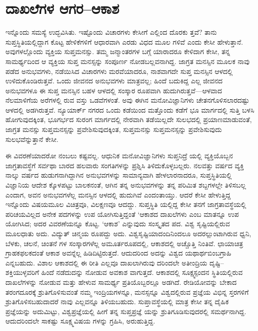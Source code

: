 \section{ದಾಖಲೆಗಳ ಆಗರ–ಆಕಾಶ}

ಇನ್ನೊಂದು ಸಮಸ್ಯೆ ಉದ್ಭವಿಸಿತು. ಇಷ್ಟೊಂದು ವಿಚಾರಗಳು ಕೇಸೀಗೆ ಎಲ್ಲಿಂದ ದೊರಕು ತ್ತವೆ? ತಾನು ಸುಪ್ತಸ್ಥಿತಿಯಲ್ಲಿದ್ದಾಗ ಕೊಟ್ಟ ಹೇಳಿಕೆಗಳಿಗೆ ಆಧಾರವಾಗಿ ಎರಡು ವಿಧದ ಮೂಲ ಗಳಿವೆ ಎಂದು ಕೇಸೀ ಹೇಳುತ್ತಾನೆ. ಅವುಗಳಲ್ಲೊಂದು ವ್ಯಕ್ತಿಯ ಸುಪ್ತಮನಸ್ಸು. ತಮ್ಮ ಜನ್ಮಾಂತರಗಳ ಬಗ್ಗೆ ಯಾರಾದರೂ ಕೇಳಿದಾಗ ಕೇಸೀ, ತನ್ನ ಸಾಮರ್ಥ್ಯದಿಂದ ಆ ವ್ಯಕ್ತಿಯ ಸುಪ್ತ ಮನಸ್ಸನ್ನು ಸಂಪೂರ್ಣ ನೋಡಬಲ್ಲವನಾಗಿದ್ದ. ಜಾಗ್ರತ ಮನಸ್ಸಿನ ಮೂಲಕ ನಾವು ಪಡೆದ ಅನುಭವಗಳು, ನಡೆಯಿಸಿದ ವಿಚಾರಗಳು ಮರವೆಯಾದರೂ, ನಾಶವಾಗದೇ ಸುಪ್ತ ಮನಸ್ಸಿನ ಆಳದಲ್ಲಿ ಉಳಿದುಕೊಂಡಿರುತ್ತವೆ. ಒಂದು ಜೀವನದ ಅನುಭವಗಳು ಮಾತ್ರವಲ್ಲ; ಹಿಂದೆ ಬದುಕಿದ್ದ ಎಲ್ಲ ಜೀವನದ ಅನುಭವಗಳೂ ಈ ಸುಪ್ತ ಮನಸ್ಸಿನ  ಬಹಳ ಆಳದಲ್ಲಿ ಸಂಸ್ಕಾರ ರೂಪವಾಗಿ ಹುದುಗಿರುತ್ತವೆ—ಆಳವಾದ ನೆಲಮಾಳಿಗೆಯ ಅರೆಗಳಲ್ಲಿ ರುವ ವಸ್ತು ಒಡವೆಗಳಂತೆ. ಅವು ಈಗಿನ ಮನೋವಿಜ್ಞಾನಿಗಳು ಚೇತನಗೊಳಿಸಲಾರದಷ್ಟು ಆಳದಲ್ಲಿ ಅಡಗಿರುತ್ತವೆ. ನ್ಯೂಯಾರ್ಕ್ ನಗರದ ಒಂದು ಕಡೆಯಿಂದ ಮತ್ತೊಂದು ಕಡೆಗೆ ಭೂ ಮಾರ್ಗದಲ್ಲಿ ಸುತ್ತಿ ಬಳಸಿ ಹೋಗುವುದಕ್ಕಿಂತ, ಭೂಗರ್ಭದ ಸುರಂಗ ಮಾರ್ಗದಲ್ಲಿ ನೇರವಾಗಿ ತಡೆಯಿಲ್ಲದೇ ಸುಲಭದಲ್ಲಿ ಪ್ರಯಾಣಮಾಡುವಂತೆ, ಜಾಗ್ರತ ಮನಸ್ಸು ಸುಪ್ತಮನಸ್ಸನ್ನು ಪ್ರವೇಶಿಸುವುದಕ್ಕಿಂತ, ಸುಪ್ತಮನಸ್ಸು ಸುಪ್ತಮನಸ್ಸನ್ನು ಪ್ರವೇಶಿಸುವುದು ಸುಲಭವೆನ್ನುತ್ತಾನೆ ಕೇಸೀ.

ಈ ವಿವರಣೆಯಾದರೋ ನಂಬಲು ಕಷ್ಟವಲ್ಲ. ಆಧುನಿಕ ಮನೋವಿಜ್ಞಾನಿಗಳು ಸುಪ್ತನಿದ್ರೆ ಯಲ್ಲಿ ವ್ಯಕ್ತಿಯೊಬ್ಬನ ಜಾಗ್ರತಾವಸ್ಥೆಗೆ ಸರ್ವಥಾ ಬಾರದ ಹಲವಾರು ಸಂಗತಿಗಳನ್ನು ಪ್ರಶ್ನಿಸಿ ತಿಳಿದುಕೊಳ್ಳಬಲ್ಲರು. ನಲವತ್ತು ವರ್ಷದ ವ್ಯಕ್ತಿ ನಾಲ್ಕು ವರ್ಷದ ಹುಡುಗನಾಗಿದ್ದಾಗಿನ ಅನುಭವಗಳನ್ನು ಸಾಮಾನ್ಯವಾಗಿ ಹೇಳಲಾರನಾದರೂ, ಸುಪ್ತಸ್ಥಿತಿಯಲ್ಲಿ ವಿಜ್ಞಾನಿಯ ಆದೇಶ ಕ್ಕೊಳಪಟ್ಟು ಬಾಲಕನಂತೆ, ಆಗಿನ ತನ್ನ ಅನುಭವಗಳನ್ನು ತನ್ನ ಪರಿಮಿತ ಶಬ್ದಗಳಲ್ಲೇ ತಿಳಿಸಬಲ್ಲ ಎಂದಾಗ, ಅವನ ಅನುಭವಗಳೆಲ್ಲ ಮನಸ್ಸಿನ ಆಳದಲ್ಲಿ ಹುದುಗಿವೆ ಎಂದಂತಾಯ್ತು. ಆದರೆ ಕೇಸೀ ಹೇಳುತ್ತಿದ್ದ ಇನ್ನೊಂದು ವಿಷಯಮೂಲ ವಿಚಿತ್ರವೂ, ವಿಲಕ್ಷಣವೂ ಆದದ್ದು. ಸುಪ್ತಸ್ಥಿತಿ ಯಲ್ಲಿದ್ದ ಕೇಸೀ ತನಗೆ ಜಾಗ್ರತಾವಸ್ಥೆಯಲ್ಲಿ ಪರಿಚಯವಿಲ್ಲದ ಅನೇಕ ಪದಗಳನ್ನು ಉಪ ಯೋಗಿಸುತ್ತಿದ್ದಂತೆ ‘ಆಕಾಶದ ದಾಖಲೆಗಳು ಎಂಬ ಮಾತನ್ನೂ ಉಪ ಯೋಗಿಸಿದ; ಅದರ ವಿವರಣೆಯನ್ನೂ ಕೊಟ್ಟ. ‘ಆಕಾಶ’ ಎನ್ನುವುದು ಸಂಸ್ಕೃತದ ಪದ. ವಿಶ್ವ ಸೃಷ್ಟಿಯಲ್ಲಿರುವ ಮೂಲಧಾತು ಅದು. ವಿದ್ಯುತ್ ಚಿನ್ಮಯ  ರೂಪದ್ದು ಅದು. ವಿಶ್ವಸೃಷ್ಟಿಯಾದಂದಿನಿಂದಲೂ ಅದರಲ್ಲುಂಟಾಗಿರುವ ಧ್ವನಿ, ಬೆಳಕು, ಚಲನೆ, ಚಿಂತನೆ ಗಳ ಸಂಸ್ಕಾರಗಳೆಲ್ಲ ಅಮೂರ್ತರೂಪದಲ್ಲಿ, ಆಕಾಶದಲ್ಲಿ ಅಚ್ಚೊತ್ತಿ ನಿಂತಿವೆ. ಛಾಯಾಚಿತ್ರ ಗ್ರಾಹಕಫಲಕದಂತೆ ಆಕಾಶ ಅವನ್ನೆಲ್ಲ ಹಿಡಿದಿಟ್ಟಿರುತ್ತದೆ. ಆದುದರಿಂದ ಅದನ್ನು ವಿಶ್ವದ ಯಥಾರ್ಥಬಿಂಬಗ್ರಾಹಿ ಎನ್ನಬಹುದು. ವಿಶಾಲ ಆಕಾಶದಲ್ಲಿ ಈ ರೀತಿ ಎಲ್ಲವೂ ದಾಖಲಾಗಿರುವು ದರಿಂದಲೇ ಅತೀಂದ್ರಿಯ ದೃಷ್ಟಿ–ಶಕ್ತಿಯುಳ್ಳವರಿಗೆ ಹಿಂದೆ ನಡೆದುದನ್ನು ನೋಡುವ ಅವಕಾಶ ವಾಗುತ್ತದೆ. ಆಕಾಶದಲ್ಲಿ ಸೂಕ್ಷ್ಮಸ್ಪಂದನ ಸ್ಥಿತಿಯಲ್ಲಿರುವ ದಾಖಲೆಗಳನ್ನು ನೋಡುವ ಮತ್ತು ಹೇಳುವ ಸಾಮರ್ಥ್ಯ ಪ್ರತಿಯೊಬ್ಬರಲ್ಲೂ ಅಡಗಿದೆ. ರೇಡಿಯೋವನ್ನು ಬೇಕಾದ ತರಂಗದೂರಕ್ಕೆ ಶ್ರುತಿಗೊಳಿಸುವಂತೆ ನಮ್ಮ ಇಂದ್ರಿಯಗಳನ್ನೂ, ಮನಸ್ಸನ್ನೂ ವಿಶ್ವದಲ್ಲಿರುವ ಪ್ರಜ್ಞೆಯ ವಿಭಿನ್ನ ಸ್ತರಗಳಿಗೆ ಶ್ರುತಿಗೊಳಿಸಬಹುದಾದರೆ ನಾವು ಎಲ್ಲವನ್ನೂ ತಿಳಿಯಬಹುದು. ಸುಪ್ತಾವಸ್ಥೆಯಲ್ಲಿ ಮಾತ್ರ ಕೇಸೀ ತನ್ನ ದೈಹಿಕ ಪ್ರಜ್ಞೆಯನ್ನು ಅದುಮಿಟ್ಟು, ವಿಶ್ವಪ್ರಜ್ಞೆಯಲ್ಲಿ ಹೀಗೆ ತನ್ನ ಸುಪ್ತಪ್ರಜ್ಞೆ ಯನ್ನು ಶ್ರುತಿಗೂಡಿಸುವುದರಲ್ಲಿ ಸಮರ್ಥನಾಗಿದ್ದ. ಆದುದರಿಂದಲೇ ಸಾಕಷ್ಟು ಸೂಕ್ಷ್ಮವಿಷಯ ಗಳನ್ನು ಗ್ರಹಿಸಿ, ಅರುಹುತ್ತಿದ್ದ.


